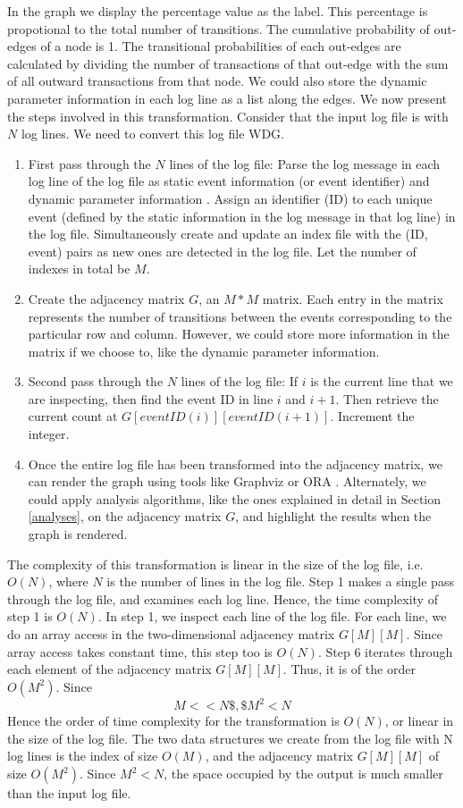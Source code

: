 \begin{enumerate}
\begin{enumerate}
In the graph we display the percentage value as the label. This percentage is propotional to the total number of transitions.  The cumulative probability of out-edges of a node is 1. The transitional probabilities of each out-edges are calculated by dividing the number of transactions of that out-edge with the sum of all outward transactions from that node. We could also store the dynamic parameter information in each log line as a list along the edges. We now present the steps involved in this transformation. Consider that the input log file is with $N$ log lines. We need to convert this log file WDG.
\begin{enumerate}
\item First pass through the $N$ lines of the log file: Parse the log message in each log line of the log file as static event information (or event identifier) and dynamic parameter information \cite{mnv10}. Assign an identifier (ID) to each unique event (defined by the static information in the log message in that log line) in the log file. Simultaneously create and update an index file with the (ID, event) pairs as new ones are detected in the log file. Let the number of indexes in total be $M$.
\item Create the adjacency matrix $G$, an $M*M$ matrix. Each entry in the matrix represents the number of transitions between the events corresponding to the particular row and column. However, we could store more information in the matrix if we choose to, like the dynamic parameter information. 
\item Second pass through the $N$ lines of the log file: If $i$ is the current line that we are inspecting, then find the event ID in line $i$ and $i+1$. Then retrieve the current count at $G[eventID(i)][eventID(i+1)]$. Increment the integer.
\item Once the entire log file has been transformed into the adjacency matrix, we can render the graph using tools like Graphviz \cite{gviz} or ORA \cite{ora}.  Alternately, we could apply analysis algorithms, like the ones explained in detail in Section \ref{analyses}, on the adjacency matrix $G$, and highlight the results when the graph is rendered.
\end{enumerate}

The complexity of this transformation is linear in the size of the log file, i.e. $O(N)$, where $N$ is the number of lines in the log file. Step 1 makes a single pass through the log file, and examines each log line. Hence, the time complexity of step 1 is $O(N)$. In step 1, we inspect each line of the log file. For each line, we do an array access in the two-dimensional adjacency matrix $G[M][M]$. Since array access takes constant time, this step too is $O(N)$. Step 6 iterates through each element of the adjacency matrix $G[M][M]$. Thus, it is of the order $O(M^2)$. Since\[ M << N\$, \$M^2 < N \] Hence the order of time complexity for the transformation is $O(N)$, or linear in the size of the log file. The two data structures we create from the log file with N log lines is the index of size $O(M)$, and the adjacency matrix $G[M][M]$ of size $O(M^2)$. Since $M^2 < N$, the space occupied by the output is much smaller than the input log file.


\end{enumerate}
\end{enumerate}
